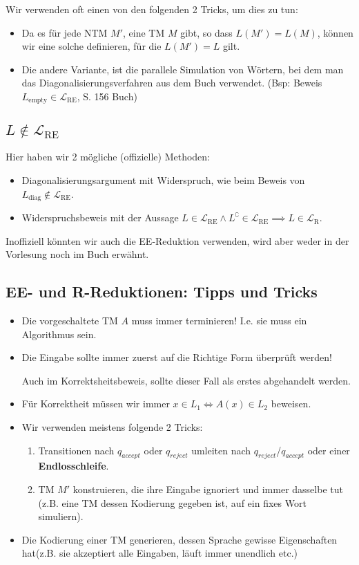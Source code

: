 \documentclass[a4paper, 11pt]{article}
\def\L{\mathcal{L}}
\begin{document}
    Wir verwenden oft einen von den folgenden 2 Tricks, um dies zu tun:
    \begin{itemize}
        \item Da es für jede NTM $M'$, eine TM $M$ gibt, so dass $L(M') = L(M)$, können wir eine solche definieren, für die $L(M') = L$ gilt.
        \item Die andere Variante, ist die parallele Simulation von Wörtern, bei dem man das Diagonalisierungsverfahren aus dem Buch verwendet. (Bsp: Beweis $L_{\text{empty}} \in \L_{\text{RE}}$, S. 156 Buch)
    \end{itemize}

    \subsection{$L \notin \L_{\text{RE}}$}
    Hier haben wir 2 mögliche (offizielle) Methoden:
    \begin{itemize}
        \item Diagonalisierungsargument mit Widerspruch, wie beim Beweis von $L_{\text{diag}} \notin \L_{\text{RE}}$.
        \item Widerspruchsbeweis mit der Aussage $L \in \L_{\text{RE}} \land L^\complement \in \L_{\text{RE}} \implies L \in \L_{\text{R}}$.
    \end{itemize}
    Inoffiziell könnten wir auch die EE-Reduktion verwenden, wird aber weder in der Vorlesung noch im Buch erwähnt.

    \subsection{EE- und R-Reduktionen: Tipps und Tricks}
    \begin{itemize}
        \item Die vorgeschaltete TM $A$ muss immer terminieren! I.e. sie muss ein Algorithmus sein.
        \item Die Eingabe sollte immer zuerst auf die Richtige Form überprüft werden!
        
        Auch im Korrektsheitsbeweis, sollte dieser Fall als erstes abgehandelt werden.
        \item Für Korrektheit müssen wir immer $x \in L_1 \iff A(x) \in L_2$ beweisen.
        \item Wir verwenden meistens folgende 2 Tricks:
        \begin{enumerate}
            \item Transitionen nach $q_{accept}$ oder $ q_{reject}$ umleiten nach $q_{reject}$/$q_{accept}$ oder einer \textbf{Endlosschleife}. 
            \item TM $M'$ konstruieren, die ihre Eingabe ignoriert und immer dasselbe tut (z.B. eine TM dessen Kodierung gegeben ist, auf ein fixes Wort simuliern).
        \end{enumerate}
        \item Die Kodierung einer TM generieren, dessen Sprache gewisse Eigenschaften hat(z.B. sie akzeptiert alle Eingaben, läuft immer unendlich etc.)
    \end{itemize}
\end{document}
